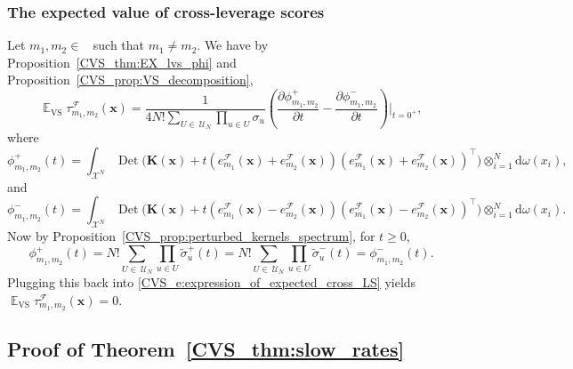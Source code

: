 \documentclass[twoside,11pt]{book}
\numberwithin{theorem}{chapter}
\numberwithin{definition}{chapter}
\numberwithin{proposition}{chapter}
\numberwithin{corollary}{chapter}
\numberwithin{example}{chapter}
\numberwithin{lemma}{chapter}
\numberwithin{assumption}{chapter}
\DeclareMathOperator{\Det}{Det}
\DeclareMathOperator{\VS}{\mathrm{VS}}
\DeclareMathOperator{\Tran}{\intercal}
\DeclareMathOperator{\EX}{\mathbb{E}}
\DeclareMathOperator{\F}{\mathcal{F}}
\DeclareMathOperator{\Ns}{\mathbb{N}^{*}}
\def\UN{\:\mathcal{U}_N}
\newcommand{\rb}[1]{\textcolor{magenta}{#1}}
\begin{document}
\subsubsection{The expected value of cross-leverage scores}
Let $m_{1},m_{2} \in \Ns$ such that $m_{1} \neq m_{2}$. We have by Proposition~\ref{CVS_thm:EX_lvs_phi} and Proposition~\ref{CVS_prop:VS_decomposition},
\begin{equation}
\EX_{\VS} \tau_{m_{1},m_{2}}^{\F}(\bm{x})  = \frac{1}{4N!\sum\limits_{U\in\UN} \prod\limits_{u \in U}\sigma_{u}} \left( \frac{\partial \phi_{m_{1},m_{2}}^{+}}{ \partial t } - \frac{\partial \phi_{m_{1},m_{2}}^{-}}{ \partial t }\right)\bigg|_{t = 0^{+}} ,
\label{CVS_e:expression_of_expected_cross_LS}
\end{equation}
where
\begin{equation}
\phi_{m_{1},m_{2}}^{+}(t) =  \int_{\mathcal{X}^{N}} \Det \bigg(\bm{K}(\bm{x})+t \left(e_{m_{1}}^{\mathcal{F}}(\bm{x}) + e_{m_{2}}^{\mathcal{F}}(\bm{x}) \right) \left(e_{m_{1}}^{\mathcal{F}}(\bm{x}) + e_{m_{2}}^{\mathcal{F}}(\bm{x}) \right)^{\Tran} \bigg) \otimes_{i =1}^{N} \mathrm{d}\omega(x_{i}),
\end{equation}
and
\begin{equation}
\phi_{m_{1},m_{2}}^{-}(t) =  \int_{\mathcal{X}^{N}} \Det \bigg(\bm{K}(\bm{x})+t \left(e_{m_{1}}^{\mathcal{F}}(\bm{x}) - e_{m_{2}}^{\mathcal{F}}(\bm{x}) \right) \left(e_{m_{1}}^{\mathcal{F}}(\bm{x}) - e_{m_{2}}^{\mathcal{F}}(\bm{x}) \right)^{\Tran} \bigg) \otimes_{i =1}^{N} \mathrm{d}\omega(x_{i}).
\end{equation}
Now by Proposition~\ref{CVS_prop:perturbed_kernels_spectrum}, for $t\geq 0$,
\begin{equation}
\phi_{m_{1},m_{2}}^{+}(t) = N!\sum\limits_{U\in\UN} \prod\limits_{u \in U} \tilde{\sigma}_{u}^{+}(t) = N!\sum\limits_{U\in\UN} \prod\limits_{u \in U} \tilde{\sigma}_{u}^{-}(t) = \phi_{m_{1},m_{2}}^{-}(t).
\end{equation}
Plugging this back into \eqref{CVS_e:expression_of_expected_cross_LS} yields $\EX_{\VS} \tau_{m_{1},m_{2}}^{\F}(\bm{x}) = 0$.

\subsection{Proof of Theorem~\ref{CVS_thm:slow_rates}}\label{CVS_app:proof_slow_rates}
\end{document}
